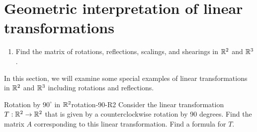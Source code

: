 \section{Geometric interpretation of linear transformations}

\begin{outcome}
  \begin{enumerate}
  \item Find the matrix of rotations, reflections, scalings, and
    shearings in $\mathbb{R}^2$ and $\mathbb{R}^3$.
  \end{enumerate}
\end{outcome}

In this section, we will examine some special examples of linear
transformations in $\mathbb{R}^2$ and $\mathbb{R}^3$ including rotations and
reflections.

\begin{example}{Rotation by $90^{\circ}$ in $\mathbb{R}^2$}{rotation-90-R2}
  Consider the linear transformation $T:\mathbb{R}^2\to\mathbb{R}^2$ that is given by
  a counterclockwise rotation by 90 degrees. Find the matrix%
   $A$ corresponding to this
  linear transformation. Find a formula for $T$.
\end{example}

